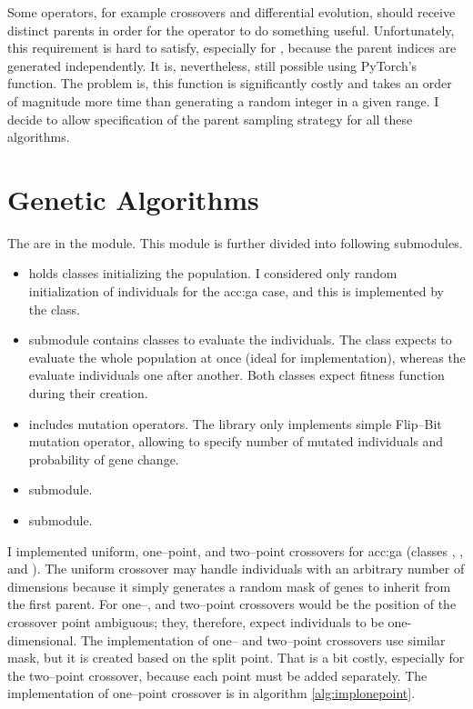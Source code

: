 Some operators, for example crossovers and differential evolution, should receive distinct parents in order for the operator to do something useful. Unfortunately, this requirement is hard to satisfy, especially for \gpuns, because the parent indices are generated independently. It is, nevertheless, still possible using PyTorch's  function. The problem is, this function is significantly costly and takes an order of magnitude more time than generating a random integer in a given range. I decide to allow specification of the parent sampling strategy for all these algorithms.



\section{Genetic Algorithms}
\label{chap:gaimpl}

The  are in the  module. This module is further divided into following submodules.
\begin{itemize}
    \item {} holds classes initializing the population. I considered only random initialization of individuals for the \acrshort{acc:ga} case, and this is implemented by the  class.
    \item {} submodule contains classes to evaluate the individuals. The  class expects to evaluate the whole population at once (ideal for \gpu implementation), whereas the  evaluate individuals one after another. Both classes expect fitness function during their creation.
    \item {} includes mutation operators. The library only implements simple Flip--Bit mutation operator, allowing to specify number of mutated individuals and probability of gene change.
    \item {} submodule.
    \item {} submodule.
\end{itemize}

I implemented uniform, one--point, and two--point crossovers for \acrshort{acc:ga} (classes , , and ). The uniform crossover may handle individuals with an arbitrary number of dimensions because it simply generates a random mask of genes to inherit from the first parent. For one--, and two--point crossovers would be the position of the crossover point ambiguous; they, therefore, expect individuals to be one-dimensional. The implementation of one-- and two--point crossovers use similar mask, but it is created based on the split point. That is a bit costly, especially for the two--point crossover, because each point must be added separately. The implementation of one--point crossover is in algorithm \ref{alg:implonepoint}.

